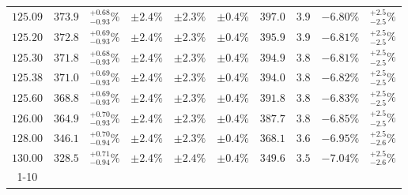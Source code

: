 \begin{table}[ht!]
{{\begin{tabular}{| cc | c | ccc | ccc | c |}
$125.09$ & $373.9$ & $^{+0.68}_{-0.93}\%$ & $\pm 2.4\%$ & {\color{black!55}$\pm 2.3\%$} & {\color{black!55}$\pm 0.4\%$} & $397.0$ & $3.9$ & $-6.80\%$ & $^{+2.5}_{-2.5}\%$ \\
$125.20$ & $372.8$ & $^{+0.69}_{-0.93}\%$ & $\pm 2.4\%$ & {\color{black!55}$\pm 2.3\%$} & {\color{black!55}$\pm 0.4\%$} & $395.9$ & $3.9$ & $-6.81\%$ & $^{+2.5}_{-2.5}\%$ \\
$125.30$ & $371.8$ & $^{+0.68}_{-0.93}\%$ & $\pm 2.4\%$ & {\color{black!55}$\pm 2.3\%$} & {\color{black!55}$\pm 0.4\%$} & $394.9$ & $3.8$ & $-6.81\%$ & $^{+2.5}_{-2.5}\%$ \\
$125.38$ & $371.0$ & $^{+0.69}_{-0.93}\%$ & $\pm 2.4\%$ & {\color{black!55}$\pm 2.3\%$} & {\color{black!55}$\pm 0.4\%$} & $394.0$ & $3.8$ & $-6.82\%$ & $^{+2.5}_{-2.5}\%$ \\
$125.60$ & $368.8$ & $^{+0.69}_{-0.93}\%$ & $\pm 2.4\%$ & {\color{black!55}$\pm 2.3\%$} & {\color{black!55}$\pm 0.4\%$} & $391.8$ & $3.8$ & $-6.83\%$ & $^{+2.5}_{-2.5}\%$ \\
$126.00$ & $364.9$ & $^{+0.70}_{-0.93}\%$ & $\pm 2.4\%$ & {\color{black!55}$\pm 2.3\%$} & {\color{black!55}$\pm 0.4\%$} & $387.7$ & $3.8$ & $-6.85\%$ & $^{+2.5}_{-2.5}\%$ \\
$128.00$ & $346.1$ & $^{+0.70}_{-0.94}\%$ & $\pm 2.4\%$ & {\color{black!55}$\pm 2.3\%$} & {\color{black!55}$\pm 0.4\%$} & $368.1$ & $3.6$ & $-6.95\%$ & $^{+2.5}_{-2.6}\%$ \\
$130.00$ & $328.5$ & $^{+0.71}_{-0.94}\%$ & $\pm 2.4\%$ & {\color{black!55}$\pm 2.4\%$} & {\color{black!55}$\pm 0.4\%$} & $349.6$ & $3.5$ & $-7.04\%$ & $^{+2.5}_{-2.6}\%$ \\
\cline{1-10}
\end{tabular}
}
}
\end{table}

